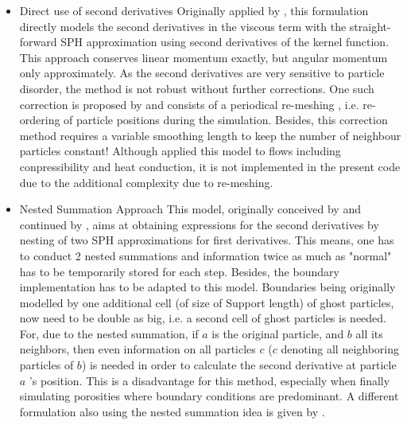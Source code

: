 \documentclass{report}
\begin{document}
\begin{itemize}
\item Direct use of second derivatives
Originally applied by \cite{Flebbe1994, Watkins1996}, this formulation directly models the second derivatives in the viscous term with the straight-forward SPH approximation using second derivatives of the kernel function. This approach conserves linear momentum exactly, but angular momentum only approximately. As the second derivatives are very sensitive to particle disorder, the method is not robust without further corrections. One such correction is proposed by \cite{Chaniotis2002} and consists of a periodical re-meshing , i.e. re-ordering of particle positions during the simulation. Besides, this correction method requires a variable smoothing length to keep the number of neighbour particles constant! Although \cite{Chaniotis2002} applied this model to flows including conpressibility and heat conduction, it is not implemented in the present code due to the additional complexity due to re-meshing.

\item Nested Summation Approach
This model, originally conceived by \cite{Flebbe1994} and continued by \cite{Speith1999}, aims at obtaining expressions for the second derivatives by nesting of two SPH approximations for first derivatives. This means, one has to conduct 2 nested summations and information twice as much as "normal" has to be temporarily stored for each step. Besides, the boundary implementation has to be adapted to this model. Boundaries being originally modelled by one additional cell (of size of Support length) of ghost particles, now need to be double as big, i.e. a second cell of ghost particles is needed. For, due to the nested summation, if $a$ is the original particle, and $b$ all its neighbors, then even information on all particles $c$ ($c$ denoting all neighboring particles of $b$) is needed in order to calculate the second derivative at particle $a$ 's position.
This is a disadvantage for this method, especially when finally simulating porosities where boundary conditions are predominant.
A different formulation also using the nested summation idea is given by \cite{Watkins1996}.


\end{itemize}
\end{document}
